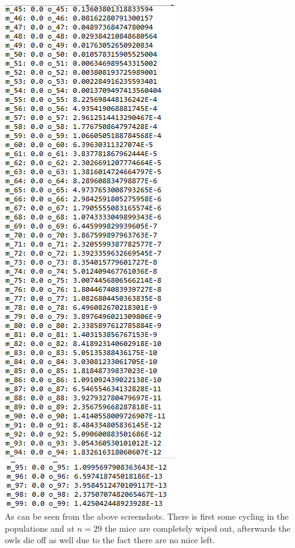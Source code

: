 \documentclass{article}
\begin{document}
\begin{enumerate}[1.]
\begin{enumerate}[(a)]
\includegraphics{mouseoutput_p2} \\
\includegraphics{mouseoutput_p3} \\

As can be seen from the above screenshots. There is first some cycling in the populations and at $n = 29$ the mice are completely wiped out, afterwards the owls die off as well due to the fact there are no mice left.

\end{enumerate}

\end{enumerate}
\end{document}
